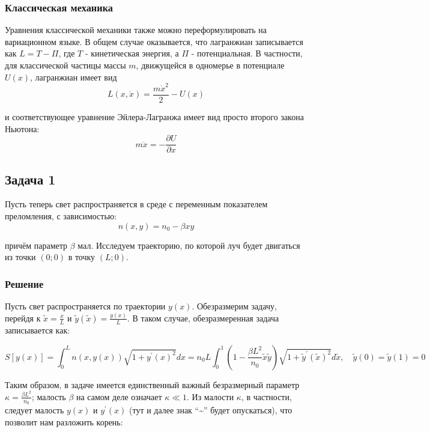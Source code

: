 \documentclass[a4paper,12pt]{article}
\begin{document}
\subsubsection*{Классическая механика}

Уравнения классической механики также можно переформулировать на вариационном
языке. В общем случае оказывается, что лагранжиан записывается как
$L=T-\Pi$, где $T$ - кинетическая энергия, а $\Pi$ - потенциальная.
В частности, для классической частицы массы $m$, движущейся в одномерье
в потенциале $U(x)$, лагранжиан имеет вид 
\[
L(x,\dot{x})=\frac{m\dot{x}^{2}}{2}-U(x)
\]

\noindent
и соответствующее уравнение Эйлера-Лагранжа имеет вид просто второго
закона Ньютона:
\[
m\ddot{x}=-\frac{\partial U}{\partial x}
\]



\subsection*{Задача 1}

Пусть теперь свет распространяется в среде с переменным показателем
преломления, с зависимостью:
\[
n\left(x,y\right)=n_{0}-\beta xy
\]

\noindent
причём параметр $\beta$ мал. Исследуем траекторию, по которой луч
будет двигаться из точки $(0;0)$ в точку $(L;0)$.


\subsubsection*{Решение}

Пусть свет распространяется по траектории $y(x)$. Обезразмерим задачу,
перейдя к $\widetilde{x}=\frac{x}{L}$ и $\widetilde{y}(\widetilde{x})=\frac{y(x)}{L}$.
В таком случае, обезразмеренная задача записывается как:

\[
S[y(x)]=\int_{0}^{L}n(x,y(x))\sqrt{1+y^{\prime}(x)^{2}}dx
=n_{0}L\int_{0}^{1}\left(1-\frac{\beta L^{2}}{n_{0}}\tilde{x}\tilde{y}\right)\sqrt{1+\tilde{y}^{\prime}\left(\tilde{x}\right)^{2}}d\tilde{x},\quad
\widetilde{y}(0)=\widetilde{y}(1)=0
\]

\noindent
Таким образом, в задаче имеется единственный важный безразмерный параметр
$\kappa=\frac{\beta L^{2}}{n_{0}}$; малость $\beta$ на самом деле
означает $\kappa\ll1$. Из малости $\kappa$, в частности, следует
малость $y(x)$ и $y^{\prime}(x)$ (тут и далее знак ``\textasciitilde{}''
будет опускаться), что позволит нам разложить корень:
\end{document}
